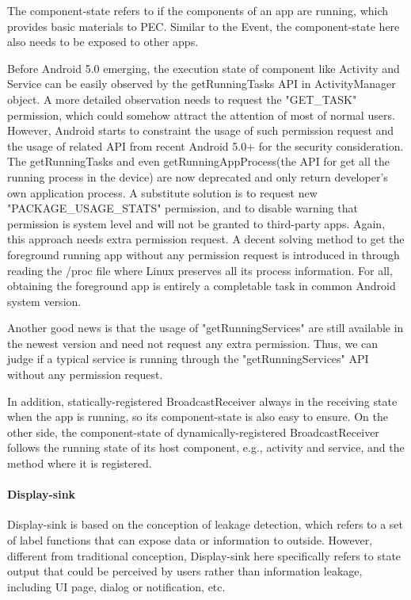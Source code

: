 \documentclass{sig-alternate-05-2015}
\begin{document}
The component-state refers to if the components of an app are running, which provides basic materials to PEC. Similar to the Event, the component-state here also needs to be exposed to other apps.

Before {\color{red}Android 5.0} emerging, the execution state of component like Activity and Service can be easily observed by the {\color{red}getRunningTasks API in ActivityManager object}. A more detailed observation needs to request the "GET\_TASK" permission, which could somehow attract the attention of most of normal users. However, Android starts to constraint the usage of such permission request and the usage of related API from recent {\color{red}Android 5.0+} for the security consideration. The getRunningTasks and even getRunningAppProcess(the API for get all the running process in the device) are now deprecated and only return developer's own application process. {\color{red}A substitute solution is to request new "PACKAGE\_USAGE\_STATS" permission, and to disable warning that permission is system level and will not be granted to third-party apps. Again, this approach needs extra permission request. } A decent solving method to get the foreground running app without any permission request is introduced in  \cite{getforeground} through reading the /proc file where Linux preserves all its process information. For all, obtaining the foreground app is entirely a completable task in common Android system version. 

Another good news is that the usage of  "getRunningServices" are still available in the newest version and need not request any extra permission. Thus, we can judge if a typical service is running through the "getRunningServices" API without any permission request. 

In addition, statically-registered BroadcastReceiver always in the receiving state when the app is running, so its component-state is also easy to ensure. On the other side, the component-state of dynamically-registered BroadcastReceiver follows the running state of its host component, e.g., activity and service, and the method where it is registered.


\paragraph{Display-sink}

Display-sink is based on the conception of leakage detection, which refers to a set of label functions that can expose data or information to outside. However, different from traditional conception, Display-sink here specifically refers to state output that could be perceived by users rather than information leakage, including UI page, dialog or notification, etc.
\end{document}
